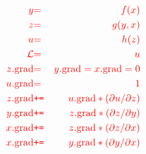 {
\vspace{-3ex}
\begin{eqnarray*}
  {\color{red} y} & {\color{red} =} & {\color{red} f(x)} \\
  {\color{red} z} & {\color{red} =} & {\color{red} g(y,x)} \\ 
  {\color{red} u} & {\color{red} =} & {\color{red} h(z)} \\
  {\color{red} {\cal L}} &  {\color{red} =} & {\color{red}  u} \\
  {\color{red} z.\mathrm{grad}} & {\color{red} =} & {\color{red} y.\mathrm{grad} = x.\mathrm{grad} = 0} \\
  {\color{red} u.\mathrm{grad}} & {\color{red} =} & {\color{red} 1} \\
  {\color{red} z.\mathrm{grad}} & {\color{red} \mbox{\tt +=}} & {\color{red} u.\mathrm{grad} * ({\partial u}/{\partial z})} \\
  {\color{red} y.\mathrm{grad}} & {\color{red} \mbox{\tt +=}} & {\color{red} z.\mathrm{grad} * ({\partial z}/{\partial y})} \\
  {\color{red} x.\mathrm{grad}} & {\color{red} \mbox{\tt +=}} & {\color{red} z.\mathrm{grad} * ({\partial z}/{\partial x})} \\
  {\color{red} x.\mathrm{grad}} & {\color{red} \mbox{\tt +=}} & {\color{red} y.\mathrm{grad} * ({\partial y}/{\partial x})}
\end{eqnarray*}

}


                
